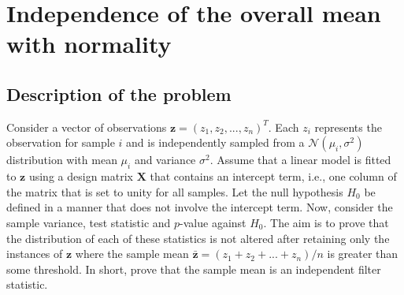 \documentclass{article}
\newcommand{\nsamples}{n}
\newcommand{\sample}{i}
\newcommand{\normal}{\mathcal{N}}
\newcommand{\normean}{\mu}
\newcommand{\normvar}{\sigma^2}
\newcommand\design{\mathbf{X}}
\newcommand{\nullhypo}[1]{H_{0#1}}
\newcommand{\logcount}{z}
\newcommand{\oriobs}[0]{\mathbf{\logcount}}
\begin{document}
\section{Independence of the overall mean with normality}

\subsection{Description of the problem}
Consider a vector of observations $\oriobs = (\logcount_1, \logcount_2, ..., \logcount_\nsamples)^T$.
Each $\logcount_\sample$ represents the observation for sample $\sample$ and is independently sampled from a $\normal(\normean_\sample, \normvar)$ distribution with mean $\normean_\sample$ and variance $\normvar$. 
Assume that a linear model is fitted to $\oriobs$ using a design matrix $\design$ that contains an intercept term, i.e., one column of the matrix that is set to unity for all samples.
Let the null hypothesis $\nullhypo{}$ be defined in a manner that does not involve the intercept term.
Now, consider the sample variance, test statistic and $p$-value against $\nullhypo{}$.
The aim is to prove that the distribution of each of these statistics is not altered after retaining only the instances of $\oriobs$ where the sample mean $\bar{\oriobs} = (\logcount_1+\logcount_2+...+\logcount_\nsamples)/\nsamples$ is greater than some threshold.
In short, prove that the sample mean is an independent filter statistic.


\end{document}
